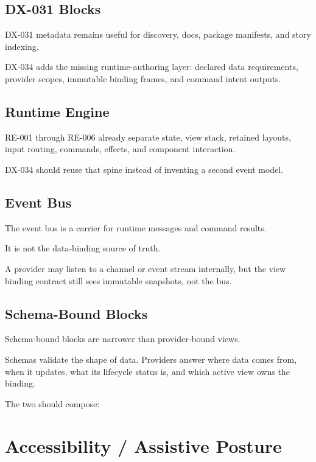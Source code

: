 \subsection{DX-031 Blocks}\label{record-132-dx-031-blocks}

DX-031 metadata remains useful for discovery, docs, package manifests, and story indexing.

DX-034 adds the missing runtime-authoring layer: declared data requirements, provider scopes, immutable binding frames, and command intent outputs.

\subsection{Runtime Engine}\label{record-132-runtime-engine}

RE-001 through RE-006 already separate state, view stack, retained layouts, input routing, commands, effects, and component interaction.

DX-034 should reuse that spine instead of inventing a second event model.

\subsection{Event Bus}\label{record-132-event-bus}

The event bus is a carrier for runtime messages and command results.

It is not the data-binding source of truth.

A provider may listen to a channel or event stream internally, but the view binding contract still sees immutable snapshots, not the bus.

\subsection{Schema-Bound Blocks}\label{record-132-schema-bound-blocks}

Schema-bound blocks are narrower than provider-bound views.

Schemas validate the shape of data. Providers answer where data comes from, when it updates, what its lifecycle status is, and which active view owns the binding.

The two should compose:



\section{Accessibility / Assistive Posture}\label{record-132-accessibility-assistive-posture}

